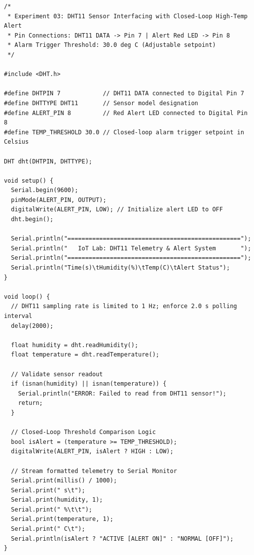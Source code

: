\documentclass[10pt,a4paper]{article}
\begin{document}
\begin{lstlisting}[style=bwArduinoPrintLarge, title={\textbf{Program Listing 3.1: Complete Arduino C++ Program for DHT11 Telemetry and Closed-Loop Alert Actuation}}]
/*
 * Experiment 03: DHT11 Sensor Interfacing with Closed-Loop High-Temp Alert
 * Pin Connections: DHT11 DATA -> Pin 7 | Alert Red LED -> Pin 8
 * Alarm Trigger Threshold: 30.0 deg C (Adjustable setpoint)
 */

#include <DHT.h>

#define DHTPIN 7            // DHT11 DATA connected to Digital Pin 7
#define DHTTYPE DHT11       // Sensor model designation
#define ALERT_PIN 8         // Red Alert LED connected to Digital Pin 8
#define TEMP_THRESHOLD 30.0 // Closed-loop alarm trigger setpoint in Celsius

DHT dht(DHTPIN, DHTTYPE);

void setup() {
  Serial.begin(9600);
  pinMode(ALERT_PIN, OUTPUT);
  digitalWrite(ALERT_PIN, LOW); // Initialize alert LED to OFF
  dht.begin();
  
  Serial.println("=================================================");
  Serial.println("   IoT Lab: DHT11 Telemetry & Alert System       ");
  Serial.println("=================================================");
  Serial.println("Time(s)\tHumidity(%)\tTemp(C)\tAlert Status");
}

void loop() {
  // DHT11 sampling rate is limited to 1 Hz; enforce 2.0 s polling interval
  delay(2000);

  float humidity = dht.readHumidity();
  float temperature = dht.readTemperature();

  // Validate sensor readout
  if (isnan(humidity) || isnan(temperature)) {
    Serial.println("ERROR: Failed to read from DHT11 sensor!");
    return;
  }

  // Closed-Loop Threshold Comparison Logic
  bool isAlert = (temperature >= TEMP_THRESHOLD);
  digitalWrite(ALERT_PIN, isAlert ? HIGH : LOW);

  // Stream formatted telemetry to Serial Monitor
  Serial.print(millis() / 1000);
  Serial.print(" s\t");
  Serial.print(humidity, 1);
  Serial.print(" %\t\t");
  Serial.print(temperature, 1);
  Serial.print(" C\t");
  Serial.println(isAlert ? "ACTIVE [ALERT ON]" : "NORMAL [OFF]");
}
\end{lstlisting}

\newpage

\end{document}
